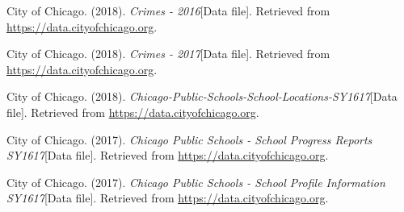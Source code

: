 \documentclass[12pt]{article}
\begin{document}
\begin{thebibliography}{12}
City of Chicago. (2018). \textit{Crimes - 2016}[Data file]. Retrieved from \href{https://data.cityofchicago.org}{https://data.cityofchicago.org}.

City of Chicago. (2018). \textit{Crimes - 2017}[Data file]. Retrieved from \href{https://data.cityofchicago.org}{https://data.cityofchicago.org}.

City of Chicago. (2018). \textit{Chicago-Public-Schools-School-Locations-SY1617}[Data file]. Retrieved from \href{https://data.cityofchicago.org}{https://data.cityofchicago.org}.

City of Chicago. (2017). \textit{Chicago Public Schools - School Progress Reports SY1617}[Data file]. Retrieved from \href{https://data.cityofchicago.org}{https://data.cityofchicago.org}.

City of Chicago. (2017). \textit{Chicago Public Schools - School Profile Information SY1617}[Data file]. Retrieved from \href{https://data.cityofchicago.org}{https://data.cityofchicago.org}.

	\end{thebibliography}
\end{document}

